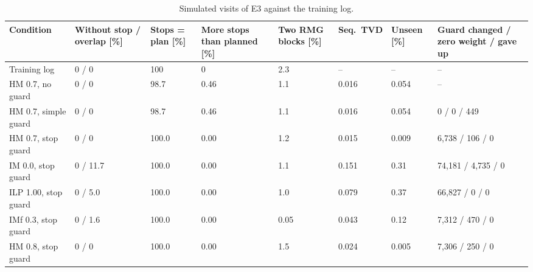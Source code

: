 \begin{table}[htbp]
\centering
\footnotesize
\setlength{\tabcolsep}{3pt}
\begin{tabularx}{\textwidth}{L{2.9cm}YYYYYYY}
\toprule
\textbf{Condition} & \textbf{Without stop / overlap [\%]} & \textbf{Stops = plan [\%]} & \textbf{More stops than planned [\%]} & \textbf{Two RMG blocks [\%]} & \textbf{Seq.\ TVD} & \textbf{Unseen [\%]} & \textbf{Guard changed / zero weight / gave up} \\
\midrule
Training log & 0 / 0 & 100 & 0 & 2.3 & -- & -- & -- \\
\midrule
HM 0.7, no guard & 0 / 0 & 98.7 & 0.46 & 1.1 & 0.016 & 0.054 & -- \\
HM 0.7, simple guard & 0 / 0 & 98.7 & 0.46 & 1.1 & 0.016 & 0.054 & 0 / 0 / 449 \\
HM 0.7, stop guard & 0 / 0 & 100.0 & 0.00 & 1.2 & 0.015 & 0.009 & 6,738 / 106 / 0 \\
\midrule
IM 0.0, stop guard & 0 / 11.7 & 100.0 & 0.00 & 1.1 & 0.151 & 0.31 & 74,181 / 4,735 / 0 \\
ILP 1.00, stop guard & 0 / 5.0 & 100.0 & 0.00 & 1.0 & 0.079 & 0.37 & 66,827 / 0 / 0 \\
IMf 0.3, stop guard & 0 / 1.6 & 100.0 & 0.00 & 0.05 & 0.043 & 0.12 & 7,312 / 470 / 0 \\
HM 0.8, stop guard & 0 / 0 & 100.0 & 0.00 & 1.5 & 0.024 & 0.005 & 7,306 / 250 / 0 \\
\bottomrule
\end{tabularx}
\par{}
\caption{Simulated visits of E3 against the training log.}
\label{tab:rq1_e3_main}
\end{table}

